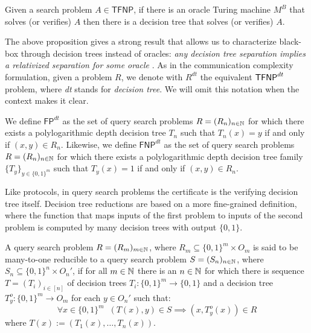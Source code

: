 \begin{proposition}
 Given a search problem $A \in \mathsf{TFNP}$, if there is an oracle Turing machine $M^B$ that solves (or verifies) $A$ then there is a decision tree that solves (or verifies) $A$.
\end{proposition}

The above proposition gives a strong result that allows us to characterize black-box \TFNP through decision trees instead of oracles: \textit{any decision tree separation implies a relativized separation for some oracle} \cite{proofs_circuits_communication, tfnp_characterization}. As in the communication complexity formulation, given a \TFNP problem $R$, we denote with $R^{dt}$ the equivalent $\textsf{TFNP}^{dt}$ problem, where \textit{dt} stands for \textit{decision tree}. We will omit this notation when the context makes it clear.

\begin{definition}
 We define $\mathsf{FP}^{dt}$ as the set of query search problems $R = (R_n)_{n \in \mathbb{N}}$ for which there exists a polylogarithmic depth decision tree $T_n$ such that $T_n(x) = y$ if and only if $(x,y) \in R_n$. Likewise, we define $\mathsf{FNP}^{dt}$ as the set of query search problems $R = (R_n)_{n \in \mathbb{N}}$ for which there exists a polylogarithmic depth decision tree family $\{T_y\}_{y \in \{0,1\}^m}$ such that $T_y(x) = 1$ if and only if $(x,y) \in R_n$.
\end{definition}

Like protocols, in query search problems the certificate is the verifying decision tree itself. Decision tree reductions are based on a more fine-grained definition, where the function that maps inputs of the first problem to inputs of the second problem is computed by many decision trees with output $\{0,1\}$.

\begin{definition}
 A query search problem $R = (R_m)_{m \in \mathbb{N}}$, where $R_m \subseteq \{0,1\}^m \times O_m$ is said to be many-to-one reducible to a query search problem $S = (S_n)_{n \in \mathbb{N}}$, where $S_n \subseteq \{0,1\}^n \times O_n'$, if for all $m \in \mathbb{N}$ there is an $n \in \mathbb{N}$ for which there is sequence $T = (T_i)_{i \in [n]}$ of decision trees $T_i : \{0,1\}^m \to \{0,1\}$ and a decision tree $T_y^o : \{0,1\}^m \to O_m$ for each $y \in O_n'$ such that:
    \[\forall x \in \{0,1\}^m \;\; (T(x), y) \in S \implies (x, T_y^o(x)) \in R\]
 where $T(x) := (T_1(x), \ldots, T_n(x))$.
\end{definition}

